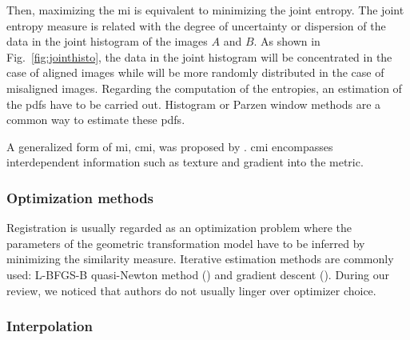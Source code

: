 Then, maximizing the \ac{mi} is equivalent to minimizing the joint entropy. The joint entropy measure is related with the degree of uncertainty or dispersion of the data in the joint histogram of the images $A$ and $B$. As shown in Fig.~\ref{fig:jointhisto}, the data in the joint histogram will be concentrated in the case of aligned images while will be more randomly distributed in the case of misaligned images. Regarding the computation of the entropies, an estimation of the \acp{pdf} have to be carried out. Histogram or Parzen window methods are a common way to estimate these \acp{pdf}.

A generalized form of \ac{mi}, \ac{cmi}, was proposed by \cite{Chappelow2011}. \ac{cmi} encompasses interdependent information such as texture and gradient into the metric.%
%
%

\subsubsection{Optimization methods}\label{subsubsec:optmea}

Registration is usually regarded as an optimization problem where the parameters of the geometric transformation model have to be inferred by minimizing the similarity measure. Iterative estimation methods are commonly used: L-BFGS-B quasi-Newton method (\cite{Byrd1995}) and gradient descent (\cite{Viola1997}). During our review, we noticed that authors do not usually linger over optimizer choice.

\subsubsection{Interpolation}\label{subsubsec:int}

